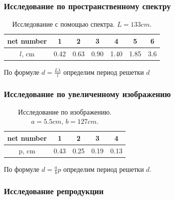 \documentclass[a4paper, 12pt]{article}
\begin{document}
	\subsubsection{Исследование по пространственному спектру}
	
	\begin{table}[h!]\label{tab:net_spectre}
		\centering
		\caption{Исследование с помощью спектра. $L = 133cm$.}
		\begin{tabular}{|c|c|c|c|c|c|c|}
			\hline
			net number & 1    & 2    & 3    & 4    & 5    & 6   \\ \hline
			$l$, cm      & 0.42 & 0.63 & 0.90 & 1.40 & 1.85 & 3.6 \\ \hline
		\end{tabular}
	\end{table}

	 По формуле $ d = \frac{L\lambda}{l} $ определим период решетки $d$
	 
	 \subsubsection{Исследование по увеличенному изображению}
	 
	 
	 \begin{table}[h!]\label{tab:ampl_img}
	 	\centering
	 	\caption{Исследование по изображению. $a = 5.5cm$, $b = 127cm$.}
	 	\begin{tabular}{|c|c|c|c|c|}
	 		\hline
	 		net number & 1    & 2    & 3    & 4    \\ \hline
	 		p, cm      & 0.43 & 0.25 & 0.19 & 0.13 \\ \hline
	 	\end{tabular}
	 \end{table}
	
	По формуле $d = \frac{a}{b}p$ определим период решетки $d$.
	
	\vspace{4\baselineskip}
	
	\subsubsection{Исследование репродукции}
	
\end{document}
